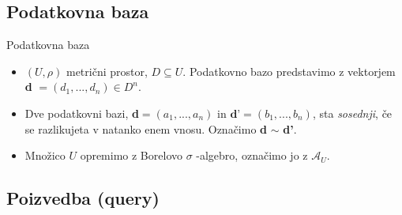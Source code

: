\documentclass{beamer}
\begin{document}
\subsection{Podatkovna baza}

\begin{frame}{Podatkovna baza}
\begin{itemize}
\item $(U, \rho)$ metrični prostor, $D \subseteq U$. Podatkovno bazo predstavimo z vektorjem \textbf{d} $= (d_{1}, ..., d_{n}) \in D^n$.
\item Dve podatkovni bazi, \textbf{d}$= (a_{1},...,a_{n})$ in $\textbf{d'}= (b_{1},...,b_{n})$,  sta \textit{sosednji}, če se razlikujeta v natanko enem vnosu. Označimo \textbf{d} $\sim$ \textbf{d'}.
\item Množico $U$ opremimo z Borelovo $\sigma$ -algebro, označimo jo z $\mathcal{A}_{U}$. 
\end{itemize}
\end{frame}

\subsection{Poizvedba (query)}
\end{document}

